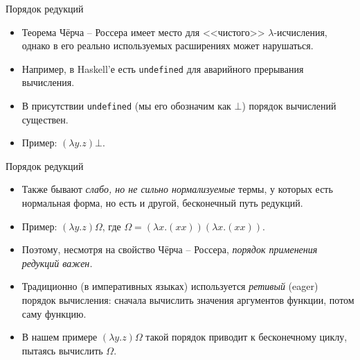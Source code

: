 \documentclass[xcolor=dvipsnames]{beamer}
\begin{document}
\begin{frame}[fragile]{Порядок редукций}
 
 \begin{itemize}[<+->]
  \item Теорема Чёрча -- Россера имеет место для <<чистого>> $\lambda$-исчисления, однако в его реально используемых расширениях может нарушаться.
  \item Например, в Haskell'е есть \texttt{undefined} для аварийного прерывания вычисления.
  \item В присутствии \texttt{undefined} (мы его обозначим как $\bot$) порядок вычислений существен.
  \item Пример: $(\lambda y. z) \bot$.
 \end{itemize}

\end{frame}


\begin{frame}{Порядок редукций}

\begin{itemize}[<+->]
 \item Также бывают {\em слабо, но не сильно нормализуемые} термы, у которых есть нормальная форма, но есть и другой, бесконечный путь редукций.
 
 \item Пример: $(\lambda y. z) \Omega$, где $\Omega = (\lambda x. (xx)) (\lambda x. (xx))$.
 
 \item Поэтому, несмотря на свойство Чёрча -- Россера, {\em порядок применения редукций важен.}
 
 \item Традиционно (в императивных языках) используется {\em ретивый} (eager) порядок вычисления: сначала вычислить значения аргументов функции, потом саму функцию.
 
 \item В нашем примере $(\lambda y.z) \Omega$ такой порядок приводит к бесконечному циклу, пытаясь вычислить $\Omega$.
\end{itemize}

 
\end{frame}
\end{document}
